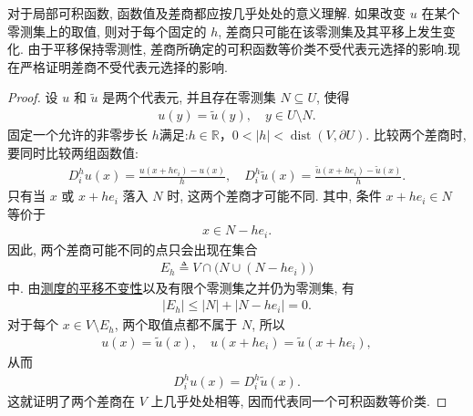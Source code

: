 \documentclass[../../main.tex]{subfiles}
\begin{document}
\begin{remark}
对于局部可积函数, 函数值及差商都应按几乎处处的意义理解.
如果改变 $u$ 在某个零测集上的取值, 则对于每个固定的 $h$, 差商只可能在该零测集及其平移上发生变化.
由于平移保持零测性, 差商所确定的可积函数等价类不受代表元选择的影响.现在严格证明差商不受代表元选择的影响.
\begin{proof}
设 $u$ 和 $\widetilde{u}$ 是两个代表元, 并且存在零测集 $N\subseteq U$, 使得
\begin{align*}
u(y)=\widetilde{u}(y),
\quad y\in U\setminus N.
\end{align*}
固定一个允许的非零步长 $h$满足:$h\in\mathbb{R}$，$0<|h|<\operatorname{dist}(V,\partial U)$.
比较两个差商时, 要同时比较两组函数值:
\begin{align*}
D_i^h u(x)
=
\frac{u(x+he_i)-u(x)}{h},\quad 
D_i^h\widetilde{u}(x)
=
\frac{\widetilde{u}(x+he_i)-\widetilde{u}(x)}{h}.
\end{align*}
只有当 $x$ 或 $x+he_i$ 落入 $N$ 时, 这两个差商才可能不同.
其中, 条件 $x+he_i\in N$ 等价于
\begin{align*}
x\in N-he_i.
\end{align*}
因此, 两个差商可能不同的点只会出现在集合
\begin{align*}
E_h\triangleq V\cap\bigl(N\cup(N-he_i)\bigr)
\end{align*}
中.
由\hyperref[Real Analysis-theorem:外测度的平移不变性]{测度的平移不变性}以及有限个零测集之并仍为零测集, 有
\begin{align*}
|E_h|
\leqslant
|N|+|N-he_i|
=0.
\end{align*}
对于每个 $x\in V\setminus E_h$, 两个取值点都不属于 $N$, 所以
\begin{align*}
u(x)=\widetilde{u}(x),\quad
u(x+he_i)=\widetilde{u}(x+he_i),
\end{align*}
从而
\begin{align*}
D_i^h u(x)=D_i^h\widetilde{u}(x).
\end{align*}
这就证明了两个差商在 $V$ 上几乎处处相等, 因而代表同一个可积函数等价类.
\end{proof}
\end{remark}
\end{document}
